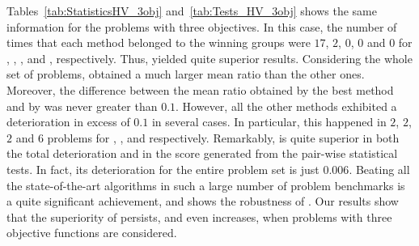 Tables~\ref{tab:StatisticsHV_3obj} and~\ref{tab:Tests_HV_3obj} shows the same information for the problems with three objectives.
%
In this case, the number of times that each method belonged to the winning groups were $17$, $2$, $0$, $0$ and $0$ 
for \AVSDMOEAD{}, \RMOEA{}, \MOEADDE{}, \NSGAIII{} and \NSGAII{}, respectively.
%
Thus, \AVSDMOEAD{} yielded quite superior results.
%
Considering the whole set of problems, \AVSDMOEAD{} obtained a much larger mean \HV{} ratio than the other ones.
%
Moreover, the difference between the mean \HV{} ratio obtained by the best method and by \AVSDMOEAD{} was never greater than $0.1$.
%
However, all the other methods exhibited a deterioration in excess of $0.1$ in several cases.
%
In particular, this happened in $2$, $2$, $2$ and $6$ problems for \MOEADDE{}, \RMOEA{}, \NSGAIII{} and \NSGAII{} respectively.
%
Remarkably, \AVSDMOEAD{} is quite superior in both the total deterioration and in the score generated from the pair-wise
statistical tests.
%
In fact, its deterioration for the entire problem set is just $0.006$.
%
Beating all the state-of-the-art algorithms in such a large number of problem benchmarks is a quite significant achievement, and shows
the robustness of \AVSDMOEAD{}.
%
%
Our results show that the superiority of \AVSDMOEAD{} persists, and even increases, when 
problems with three objective functions are considered.
%
%
%
%



